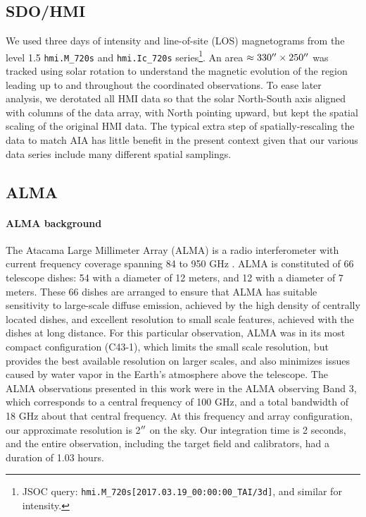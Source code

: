 \documentclass[twocolumn]{aastex62}
\begin{document}
\subsection{SDO/HMI}
We used three days of intensity and line-of-site (LOS) magnetograms from the level 1.5 \texttt{hmi.M\_720s} and \texttt{hmi.Ic\_720s} series\footnote{JSOC query: \texttt{hmi.M\_720s[2017.03.19\_00:00:00\_TAI/3d]}, and similar for intensity.}.  
An area $\approx330\mbox{$^{\prime\prime}$}{}\times250\mbox{$^{\prime\prime}$}{}$ was tracked using solar rotation to understand the magnetic evolution of the region leading up to and throughout the coordinated observations.  
To ease later analysis, we derotated all HMI data so that the solar North-South axis aligned with columns of the data array, with North pointing upward, but kept the spatial scaling of the original HMI data.  
The typical extra step of spatially-rescaling the data to match AIA  has little benefit in the present context given that our various data series include many different spatial samplings.

\subsection{ALMA}
\paragraph{ALMA background} The Atacama Large Millimeter Array (ALMA) is a radio interferometer with current frequency coverage spanning 84 to 950 GHz \citep{2009WootenThompson_ALMA}. 
ALMA is constituted of 66 telescope dishes: 54 with a diameter of 12 meters, and 12 with a diameter of 7 meters. 
These 66 dishes are arranged to ensure that ALMA has suitable sensitivity to large-scale diffuse emission, achieved by the high density of centrally located dishes, and excellent resolution to small scale features, achieved with the dishes at long distance. 
For this particular observation, ALMA was in its most compact configuration (C43-1), which limits the small scale resolution, but provides the best available resolution on larger scales, and also minimizes issues caused by water vapor in the Earth's atmosphere above the telescope.
The ALMA observations presented in this work were in the ALMA observing Band 3, which corresponds to a central frequency of 100 GHz, and a total bandwidth of 18 GHz about that central frequency. 
At this frequency and array configuration, our approximate resolution is 2$\mbox{$^{\prime\prime}$}$ on the sky. 
Our integration time is 2 seconds, and the entire observation, including the target field and calibrators, had a duration of 1.03 hours. 
\end{document}
